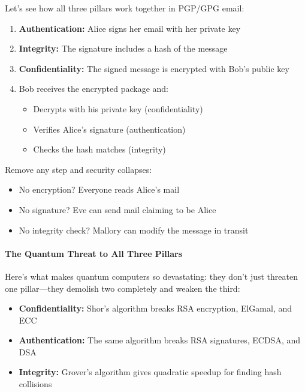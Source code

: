 \documentclass[11pt,a4paper]{article}
\begin{document}
Let's see how all three pillars work together in PGP/GPG email:

\begin{enumerate}
    \item \textbf{Authentication:} Alice signs her email with her private key
    \item \textbf{Integrity:} The signature includes a hash of the message
    \item \textbf{Confidentiality:} The signed message is encrypted with Bob's public key
    \item Bob receives the encrypted package and:
        \begin{itemize}
            \item Decrypts with his private key (confidentiality)
            \item Verifies Alice's signature (authentication)
            \item Checks the hash matches (integrity)
        \end{itemize}
\end{enumerate}

Remove any step and security collapses:
\begin{itemize}
    \item No encryption? Everyone reads Alice's mail
    \item No signature? Eve can send mail claiming to be Alice  
    \item No integrity check? Mallory can modify the message in transit
\end{itemize}

\paragraph{The Quantum Threat to All Three Pillars}

Here's what makes quantum computers so devastating: they don't just threaten one pillar---they demolish two completely and weaken the third:

\begin{itemize}
    \item \textbf{Confidentiality:} Shor's algorithm breaks RSA encryption, ElGamal, and ECC
    \item \textbf{Authentication:} The same algorithm breaks RSA signatures, ECDSA, and DSA
    \item \textbf{Integrity:} Grover's algorithm gives quadratic speedup for finding hash collisions
\end{itemize}
\end{document}

